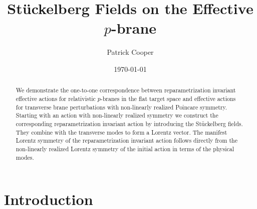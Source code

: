 \documentclass[%
 reprint,
 amsmath,amssymb,
 aps,
]{revtex4-1}
\begin{document}

\title{St\"uckelberg Fields on the Effective $p$-brane}

\author{Patrick Cooper}

\date{\today}

\begin{abstract}
We  demonstrate the one-to-one correspondence between reparametrization invariant effective actions for relativistic  $p$-branes
in the flat target space and effective actions for transverse brane perturbations with non-linearly realized Poincare symmetry.
Starting with an action with non-linearly realized symmetry we construct the corresponding reparametrization invariant action by introducing
the St\"uckelberg fields. They combine with the transverse modes to form a Lorentz vector. The manifest Lorentz symmetry of the reparametrization invariant action
follows directly from the non-linearly  realized Lorentz symmetry of the initial action in terms of the physical modes.
\end{abstract}

\maketitle


\section{\label{sec:level1}Introduction}
\end{document}
